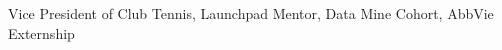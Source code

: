 
\cventry
    {} %
    {} %
    {} %
    {} %
    {
    {Vice President of Club Tennis, Launchpad Mentor, Data Mine Cohort, AbbVie Externship }
    }
